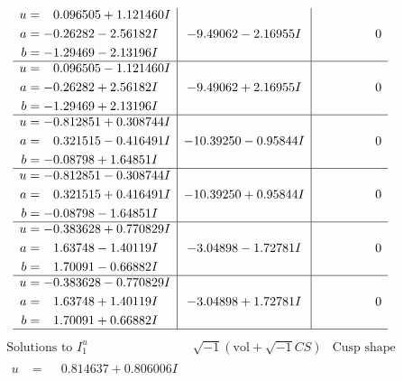 \documentclass[1p]{elsarticle_modified}
\theoremstyle{definition}
\newcommand{\I}{\sqrt{-1}}
\begin{document}
$$\begin{array}{c|c|c}
\begin{aligned}
u &= \phantom{-}0.096505 + 1.121460 I \\
a &= -0.26282 - 2.56182 I \\
b &= -1.29469 - 2.13196 I\end{aligned}
 & -9.49062 - 2.16955 I & \phantom{-0.000000 } 0 \\ \hline\begin{aligned}
u &= \phantom{-}0.096505 - 1.121460 I \\
a &= -0.26282 + 2.56182 I \\
b &= -1.29469 + 2.13196 I\end{aligned}
 & -9.49062 + 2.16955 I & \phantom{-0.000000 } 0 \\ \hline\begin{aligned}
u &= -0.812851 + 0.308744 I \\
a &= \phantom{-}0.321515 - 0.416491 I \\
b &= -0.08798 + 1.64851 I\end{aligned}
 & -10.39250 - 0.95844 I & \phantom{-0.000000 } 0 \\ \hline\begin{aligned}
u &= -0.812851 - 0.308744 I \\
a &= \phantom{-}0.321515 + 0.416491 I \\
b &= -0.08798 - 1.64851 I\end{aligned}
 & -10.39250 + 0.95844 I & \phantom{-0.000000 } 0 \\ \hline\begin{aligned}
u &= -0.383628 + 0.770829 I \\
a &= \phantom{-}1.63748 - 1.40119 I \\
b &= \phantom{-}1.70091 - 0.66882 I\end{aligned}
 & -3.04898 - 1.72781 I & \phantom{-0.000000 } 0 \\ \hline\begin{aligned}
u &= -0.383628 - 0.770829 I \\
a &= \phantom{-}1.63748 + 1.40119 I \\
b &= \phantom{-}1.70091 + 0.66882 I\end{aligned}
 & -3.04898 + 1.72781 I & \phantom{-0.000000 } 0\\
 \hline 
 \end{array}$$\newpage$$\begin{array}{c|c|c}  
\text{Solutions to }I^u_{1}& \I (\text{vol} + \sqrt{-1}CS) & \text{Cusp shape}\\
 \hline 
\begin{aligned}
u &= \phantom{-}0.814637 + 0.806006 I \\

\end{aligned}
\end{array}$$
\end{document}
